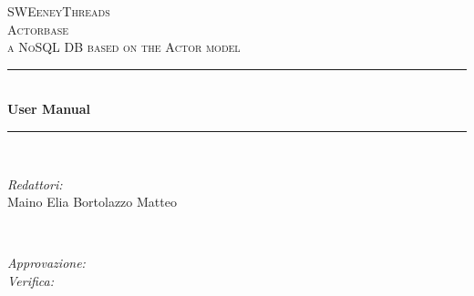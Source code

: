 \documentclass[a4paper]{article}
\begin{document}
	
	\begin{titlepage}
		\newcommand{\HRule}{\rule{\linewidth}{0.5mm}} 
		\center  
		
		\textsc{\LARGE SWEeneyThreads}\\[1.5cm] 
		\textsc{\Large Actorbase}\\[0.5cm] 
		\textsc{\large a NoSQL DB based on the Actor model}\\[0.5cm]
		
		
		\HRule \\[0.4cm]
		{ \huge \bfseries User Manual}\\[0.4cm] 
		\HRule \\[1.5cm]
		
		\begin{minipage}{0.4\textwidth}
			\begin{flushleft} \large
				\emph{Redattori:}\\
				Maino Elia \newline
				Bortolazzo Matteo \\
			\end{flushleft}
		\end{minipage}
		~
		\begin{minipage}{0.4\textwidth}
			\begin{flushright} \large
				\emph{Approvazione:} \\
				\emph{Verifica:} 
			\end{flushright}
		\end{minipage}
		

\end{titlepage}
\end{document}
